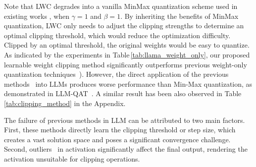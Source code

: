 \documentclass{article} %
\begin{document}
Note that LWC degrades into a vanilla MinMax quantization scheme used in existing works \citep{smoothquant},\cite{gptq} when $\gamma=1$ and $\beta=1$. 
%
By inheriting the benefits of MinMax quantization, LWC only needs to adjust the clipping strengths to determine an optimal clipping threshold, which would reduce the optimization difficulty.
Clipped by an optimal threshold, the original weights would be easy to quantize.
%
As indicated by the experiments in Table\,\ref{tab:llama_weight_only}, our proposed learnable weight clipping method significantly outperforms previous weight-only quantization techniques~\citep{gptq,awq}).
%
%
\iffalse
However, the direct application of the previous methods~\citep{lsq,statsq,pact} into LLMs produces worse performance than Min-Max quantization, as demonstrated in  LLM-QAT~\citep{llmqat}. A similar result has been also observed in Table\,\ref{tab:clipping_method} in the Appendix.

%
The failure of previous methods in LLM can be attributed to two main factors. First, these methods directly learn the clipping threshold or step size, which creates a vast solution space and poses a significant convergence challenge. Second, outliers~\citep{llmint8} in activation significantly affect the final output, rendering the activation unsuitable for clipping operations.
%
\end{document}
